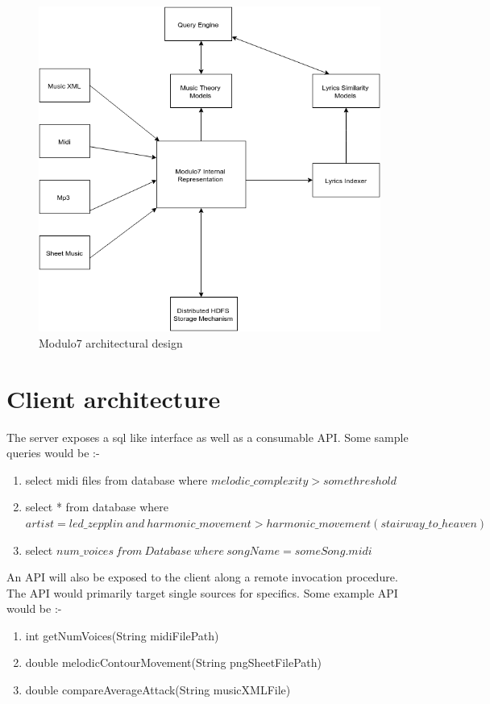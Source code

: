 \begin{figure}
\centering
\includegraphics[width=\textwidth]{Modulo7Architecture.png}
\makeatletter
\let\@currsize\normalsize
\caption{Modulo7 architectural design}
\label{fig:Architectural Design}
\end{figure}
\newpage
\section{Client architecture}
\noindent The server exposes a sql like interface as well as a consumable API. Some sample queries would be :-
\begin{enumerate}
\item select midi files from database where $melodic\_complexity > some threshold$
\item select * from database where $artist = led\_zepplin \ and \ harmonic\_movement > harmonic\_movement(stairway\_to\_heaven)$
\item select $ num\_voices \ from \ Database \ where \ songName = someSong.midi$ 
\end{enumerate}

An API will also be exposed to the client along a remote invocation procedure. The API would primarily target single sources for specifics. Some example API would be :-
\begin{enumerate}
\item int getNumVoices(String midiFilePath)
\item double melodicContourMovement(String pngSheetFilePath)
\item double compareAverageAttack(String musicXMLFile)
\end{enumerate}

